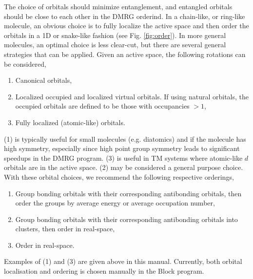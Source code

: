 \documentclass[letterpaper,12pt,aps, pra]{revtex4-1}
\begin{document}
The choice of orbitals should
minimize entanglement, and entangled orbitals should be close to each other in the DMRG orderind.
In a chain-like, or ring-like molecule, an obvious choice is to fully localize the active space and then order the orbitals in a 1D or snake-like fashion (see Fig. \ref{fig:order}). In
more general molecules, an optimal choice is less clear-cut, but there are several general strategies that can be applied. Given an active space, the following rotations can be considered,
\begin{enumerate}
\item Canonical orbitals,
\item Localized occupied and localized virtual orbitals. If using natural orbitals, the occupied orbitals are defined to be those with occupancies $>1$,
\item Fully localized (atomic-like) orbitals.
\end{enumerate}
(1) is typically useful for small molecules (e.g. diatomics) and if the molecule has high symmetry, especially since high point group symmetry leads to significant speedups in the DMRG program.
(3) is useful in TM systems where atomic-like $d$ orbitals are in the active space. (2) may be considered a general purpose choice. With these orbital choices,
we recommend the following respective orderings,
\begin{enumerate}
\item Group bonding orbitals with their corresponding antibonding orbitals, then order the groups by average energy or average occupation number,
\item Group bonding orbitals with their corresponding antibonding orbitals into clusters, then order in real-space,
\item Order in real-space.
\end{enumerate}
Examples of (1) and (3) are given above in this manual. Currently, both orbital localisation and ordering is chosen manually in the Block program.



%
\end{document}

